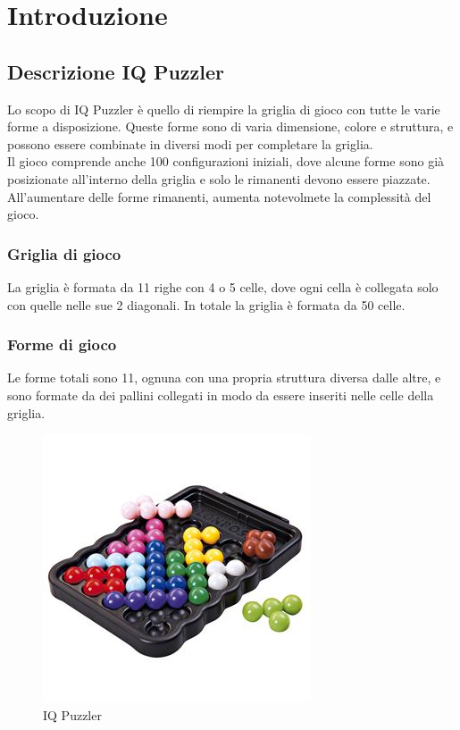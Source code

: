 
\chapter{Introduzione}
\label{cap:introduzione}
\section{Descrizione IQ Puzzler}
Lo scopo di IQ Puzzler è quello di riempire la griglia di gioco con tutte le varie forme a disposizione. Queste forme sono di varia dimensione, colore e struttura, e possono essere combinate in diversi modi per completare la griglia.\\
Il gioco comprende anche 100 configurazioni iniziali, dove alcune forme sono già posizionate all'interno della griglia e solo le rimanenti devono essere piazzate. All'aumentare delle forme rimanenti, aumenta notevolmete la complessità del gioco.\\ 
\subsection{Griglia di gioco}
La griglia è formata da 11 righe con 4 o 5 celle, dove ogni cella è collegata solo con quelle nelle sue 2 diagonali. In totale la griglia è formata da 50 celle.
\subsection{Forme di gioco}
Le forme totali sono 11, ognuna con una propria struttura diversa dalle altre, e sono formate da dei pallini collegati in modo da essere inseriti nelle celle della griglia.

\begin{figure}[h]
	\centering
	\includegraphics[scale=0.5]{immagini/iqpuzzler}
	\caption{IQ Puzzler}
	\label{fig:iqpuzzler}
\end{figure}



